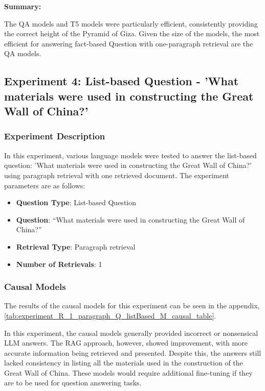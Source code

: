 \documentclass{wseas}
\begin{document}
\textbf{Summary:}

The QA models and T5 models were particularly efficient, consistently
providing the correct height of the Pyramid of Giza. Given the size of
the models, the most efficient for answering fact-based Question with
one-paragraph retrieval are the QA models.

\subsection{Experiment 4: List-based Question - 'What materials were
used in constructing the Great Wall of China?'}

\subsubsection{Experiment Description}

In this experiment, various language models were tested to answer the
list-based question: 'What materials were used in constructing the
Great Wall of China?' using paragraph retrieval with one retrieved
document. The experiment parameters are as follows:

\begin{itemize}
  \item
    \textbf{Question Type}: List-based Question
  \item
    \textbf{Question}: ``What materials were used in constructing the
    Great Wall of China?''
  \item
    \textbf{Retrieval Type}: Paragraph retrieval
  \item
    \textbf{Number of Retrievals}: 1
\end{itemize}

\subsubsection{Causal Models}

The results of the causal models for this experiment can be seen 
in the appendix, \autoref{tab:experiment_R_1_paragraph_Q_listBased_M_causal_table}.

In this experiment, the causal models generally provided incorrect or
nonsensical LLM answers. The RAG approach, however, showed improvement,
with more accurate information being retrieved and presented. Despite
this, the answers still lacked consistency in listing all the materials
used in the construction of the Great Wall of China. These models would require 
additional fine-tuning if they are to be used for question answering tasks.
\end{document}
